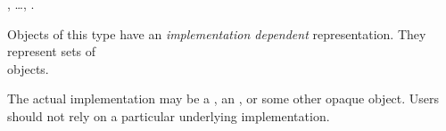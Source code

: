 \documentclass[../Exception-Handling.tex]{subfiles}
\begin{document}

\DSupertypes{}

, \ldots, .

\DDescription{}

Objects of this type have an \emph{implementation dependent}
representation. They represent sets of\\
 objects.

\DNotes{}

The actual implementation may be a , an
, or some other opaque object.  Users should
not rely on a particular underlying implementation.
\end{document}
